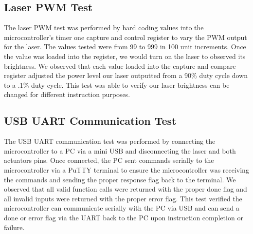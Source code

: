 \documentclass[11pt]{LaTeX-Classes/math-hw}
\begin{document}
\subsection{Laser PWM Test}
The laser PWM test was performed by hard coding values into the microcontroller's timer one capture and control register to vary the PWM output for the laser. The values tested were from 99 to 999 in 100 unit increments. Once the value was loaded into the register, we would turn on the laser to observed its brightness. We observed that each value loaded into the capture and compare register adjusted the power level our laser outputted from a 90\% duty cycle down to a .1\% duty cycle. This test was able to verify our laser brightness can be changed for different instruction purposes.
 
\subsection{USB UART Communication Test}
The USB UART communication test was performed by connecting the microcontroller to a PC via a mini USB and disconnecting the laser and both actuators pins. Once connected, the PC sent commands serially to the microcontroller via a PuTTY terminal to ensure the microcontroller was receiving the commands and sending the proper response flag back to the terminal. We observed that all valid function calls were returned with the proper done flag and all invalid inputs were returned with the proper error flag. This test verified the microcontroller can communicate serially with the PC via USB and can send a done or error flag via the UART back to the PC upon instruction completion or failure.
\end{document}
